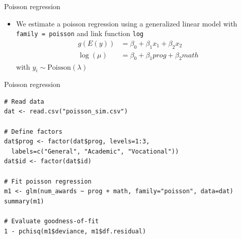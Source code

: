 \documentclass[aspectratio=169]{beamer}
\begin{document}
\begin{frame}{Poisson regression}
  \begin{itemize}
    \item We estimate a poisson regression using a generalized linear model
      with \texttt{family = poisson} and link function \texttt{log}
  \begin{align*}
    g(E(y)) & = \beta_0 + \beta_1 x_1 + \beta_2 x_2\\
    \log(\mu) & = \beta_0 + \beta_1 prog + \beta_2 math
  \end{align*}
  with $y_i \sim \text{Poisson}(\lambda)$
  \end{itemize}
\end{frame}

\begin{frame}[fragile]{Poisson regression}
  \begin{lstlisting}
# Read data
dat <- read.csv("poisson_sim.csv")

# Define factors
dat$prog <- factor(dat$prog, levels=1:3,
  labels=c("General", "Academic", "Vocational"))
dat$id <- factor(dat$id)

# Fit poisson regression
m1 <- glm(num_awards ~ prog + math, family="poisson", data=dat)
summary(m1)

# Evaluate goodness-of-fit
1 - pchisq(m1$deviance, m1$df.residual)
\end{lstlisting}
\end{frame}
\end{document}
